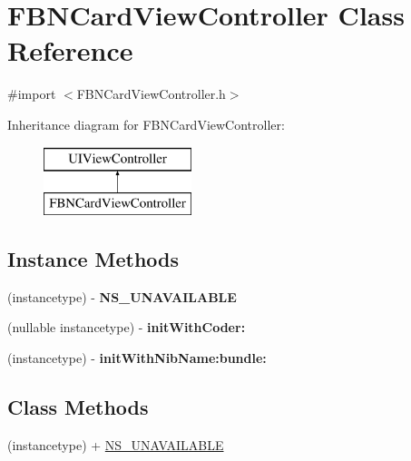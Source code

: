 \hypertarget{interface_f_b_n_card_view_controller}{}\section{F\+B\+N\+Card\+View\+Controller Class Reference}
\label{interface_f_b_n_card_view_controller}


{\ttfamily \#import $<$F\+B\+N\+Card\+View\+Controller.\+h$>$}

Inheritance diagram for F\+B\+N\+Card\+View\+Controller\+:\begin{figure}[H]
\begin{center}
\leavevmode
\includegraphics[height=2.000000cm]{interface_f_b_n_card_view_controller}
\end{center}
\end{figure}
\subsection*{Instance Methods}
\begin{DoxyCompactItemize}
\item 
\hypertarget{interface_f_b_n_card_view_controller_a022113a53e4e6eea23a121cbdec74a59}{}(instancetype) -\/ {\bfseries N\+S\+\_\+\+U\+N\+A\+V\+A\+I\+L\+A\+B\+L\+E}\label{interface_f_b_n_card_view_controller_a022113a53e4e6eea23a121cbdec74a59}

\item 
\hypertarget{interface_f_b_n_card_view_controller_ae51144fc592e3c68ba46ee6cbf622726}{}(nullable instancetype) -\/ {\bfseries init\+With\+Coder\+:}\label{interface_f_b_n_card_view_controller_ae51144fc592e3c68ba46ee6cbf622726}

\item 
\hypertarget{interface_f_b_n_card_view_controller_af20efd370d98a1608b6bed8b25397916}{}(instancetype) -\/ {\bfseries init\+With\+Nib\+Name\+:bundle\+:}\label{interface_f_b_n_card_view_controller_af20efd370d98a1608b6bed8b25397916}

\end{DoxyCompactItemize}
\subsection*{Class Methods}
\begin{DoxyCompactItemize}
\item 
(instancetype) + \hyperlink{interface_f_b_n_card_view_controller_a022113a53e4e6eea23a121cbdec74a59}{N\+S\+\_\+\+U\+N\+A\+V\+A\+I\+L\+A\+B\+L\+E}
\begin{DoxyCompactList}\small\item\em 

 \end{DoxyCompactList}\end{DoxyCompactItemize}
